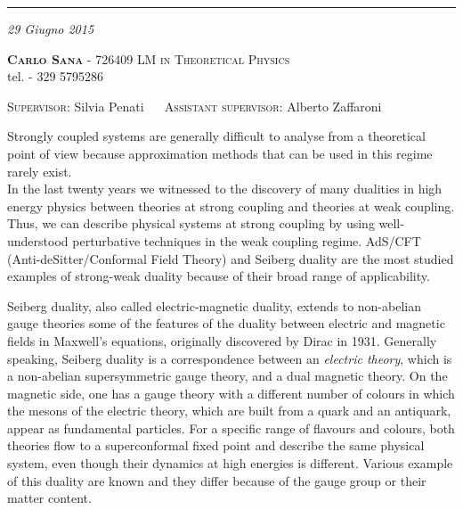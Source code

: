 \documentclass[a4paper,11pt]{article}
\date{}
\title{ \textbf{\boldmath{4D to 3D reduction of Seiberg duality for $SU(N)$ susy gauge theories with adjoint matter: a partition function approach }}	}
\author{}
\begin{document}
\maketitle
\vspace*{-2.3cm}
\begin{center}
\rule{\textwidth}{0.6pt}
\textit {29 Giugno 2015} \\
 \end{center}
\vspace{-0.3cm}
	 \textbf{\noindent%
	 \scshape%
	 Carlo Sana} - \textsf{726409}  \hfill
 {\scshape LM in Theoretical Physics} 
\\
\noindent  tel. \textsf{- 329 5795286}\\
\vspace{-0.5cm}
\begin{center}
{\scshape Supervisor}: 
\textsf{Silvia Penati} 
~~
{\scshape Assistant supervisor}:
\textsf{Alberto Zaffaroni}

\end{center}



Strongly coupled systems are generally difficult to analyse from a theoretical point of view because approximation methods that can be used in this regime rarely exist.\\
In the last twenty years we witnessed to the discovery of many dualities in high energy physics between theories at strong coupling and theories at weak coupling.
Thus, we can describe physical systems at strong coupling by using well-understood perturbative techniques in the weak coupling regime. 
AdS/CFT (Anti-deSitter/Conformal Field Theory) and Seiberg duality are the most studied examples of strong-weak duality because of their broad range of applicability.

Seiberg duality, also called electric-magnetic duality, extends to non-abelian gauge theories some of the features of the duality between electric and magnetic fields in Maxwell's equations, originally discovered by Dirac in 1931.
Generally speaking, Seiberg duality is a correspondence between an \emph{electric theory}, which is a non-abelian supersymmetric gauge theory, and a dual magnetic theory. 
On the magnetic side, one has a gauge theory with a different number of colours  in which the mesons of the electric theory, which are built from a quark and an antiquark, appear as fundamental particles.
For a specific range of flavours and colours, both theories flow to a superconformal fixed point and describe the same physical system, even though their dynamics at high energies is different.
Various example of this duality are known and they differ because of the gauge group or their matter content.
\end{document}
